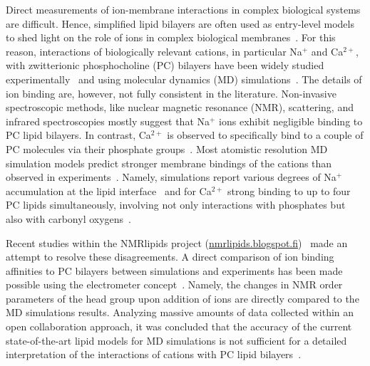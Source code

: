 \documentclass[journal=jpcbfk,manuscript=article]{achemso}
\begin{document}
Direct measurements of ion-membrane interactions in complex biological systems are difficult. 
Hence, simplified lipid bilayers are often used as entry-level models to shed light on the role of ions in complex biological membranes~\cite{scherer87,seelig90,cevc90}. 
For this reason, interactions of biologically relevant cations, in particular Na$^+$ and Ca$^{2+}$, with zwitterionic phosphocholine (PC) bilayers have been widely studied experimentally~\cite{akutsu81, altenbach84, seelig90, cevc90, tocanne90, binder02, pabst07, uhrikova08} and using molecular dynamics (MD) simulations~\cite{bockmann03, bockmann04, Berkowitz12, melcrova16, javanainen17}. The details of ion binding are, however, not fully consistent in the literature. Non-invasive spectroscopic methods, like nuclear magnetic resonance (NMR), scattering, and infrared spectroscopies mostly suggest that Na$^+$ ions exhibit negligible binding to PC lipid bilayers. In contrast, Ca$^{2+}$ is observed to specifically bind to a couple of PC molecules via their phosphate groups~\cite{hauser76, hauser78, herbette84, akutsu81, altenbach84, binder02, pabst07, uhrikova08}. Most atomistic resolution MD simulation models predict stronger membrane bindings of the cations than observed in experiments~\cite{catte16}. Namely, simulations report various degrees of Na$^+$ accumulation at the lipid interface~\cite{bockmann03} and for Ca$^{2+}$ strong binding to up to four PC lipids simultaneously, involving not only interactions with phosphates but also with carbonyl oxygens~\cite{bockmann04, melcrova16, javanainen17}.

Recent studies within the NMRlipids project (\url{nmrlipids.blogspot.fi})~\cite{catte16} made an attempt to resolve these disagreements. A direct comparison of ion binding affinities to PC bilayers between simulations and experiments has been made possible using the electrometer concept~\cite{seelig87}. Namely, the changes in NMR order parameters of the head group upon addition of ions are directly compared to the MD simulations results. 
Analyzing massive amounts of data collected within an open collaboration approach, 
it was concluded that the accuracy of the current state-of-the-art lipid models for MD simulations is not sufficient for a detailed interpretation of the interactions of cations with PC lipid bilayers~\cite{catte16}.
\end{document}
